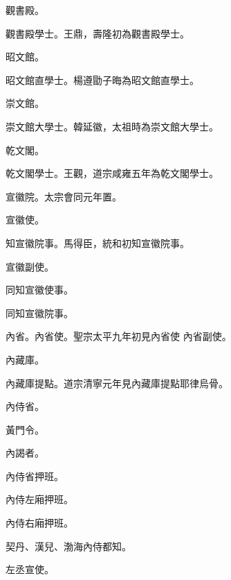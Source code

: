 \begin{pinyinscope}
 觀書殿。



 觀書殿學士。王鼎，壽隆初為觀書殿學士。



 昭文館。



 昭文館直學士。楊遵勖子晦為昭文館直學士。



 崇文館。



 崇文館大學士。韓延徽，太祖時為崇文館大學士。



 乾文閣。



 乾文閣學士。王觀，道宗咸雍五年為乾文閣學士。



 宣徽院。太宗會同元年置。



 宣徽使。



 知宣徽院事。馬得臣，統和初知宣徽院事。



 宣徽副使。



 同知宣徽使事。



 同知宣徽院事。



 內省。內省使。聖宗太平九年初見內省使
 內省副使。



 內藏庫。



 內藏庫提點。道宗清寧元年見內藏庫提點耶律烏骨。



 內侍省。



 黃門令。



 內謁者。



 內侍省押班。



 內侍左廂押班。



 內侍右廂押班。



 契丹、漢兒、渤海內侍都知。



 左丞宣使。




\end{pinyinscope}
